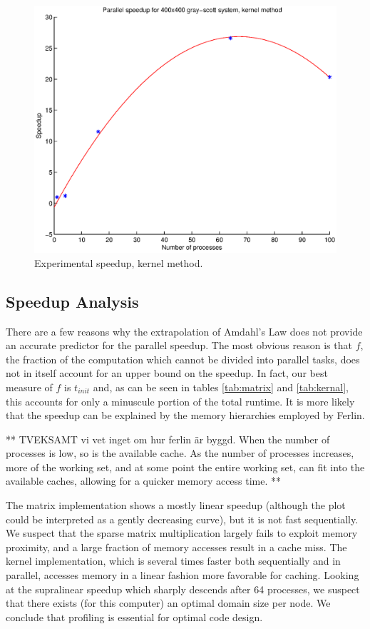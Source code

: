 \documentclass[a4paper,11pt]{article}
\begin{document}
\begin{figure}
  \centering
  \includegraphics[scale=0.6]{kernel}
    \caption{Experimental speedup, kernel method.}
    \label{fig:kernel}
\end{figure}

\subsection*{Speedup Analysis}
There are a few reasons why the extrapolation of Amdahl's Law does not provide an accurate predictor for the parallel speedup.  The most obvious reason is that $f$, the fraction of the computation which cannot be divided into parallel tasks, does not in itself account for an upper bound on the speedup.  In fact, our best measure of $f$ is $t_{init}$ and, as can be seen in tables \ref{tab:matrix} and \ref{tab:kernal}, this accounts for only a minuscule portion of the total runtime.  It is more likely that the speedup can be explained by the memory hierarchies employed by Ferlin.  

** TVEKSAMT vi vet inget om hur ferlin är byggd. When the number of processes is low, so is the available cache.  As the number of processes increases, more of the working set, and at some point the entire working set, can fit into the available caches, allowing for a quicker memory access time. **

The matrix implementation shows a mostly linear speedup (although the plot could be interpreted as a gently decreasing curve), but it is not fast sequentially. We suspect that the sparse matrix multiplication largely fails to exploit memory proximity, and a large fraction of memory accesses result in a cache miss. The kernel implementation, which is several times faster both sequentially and in parallel, accesses memory in a linear fashion more favorable for caching. Looking at the supralinear speedup which sharply descends after 64 processes, we suspect that there exists (for this computer) an optimal domain size per node. We conclude that profiling is essential for optimal code design.
\end{document}
